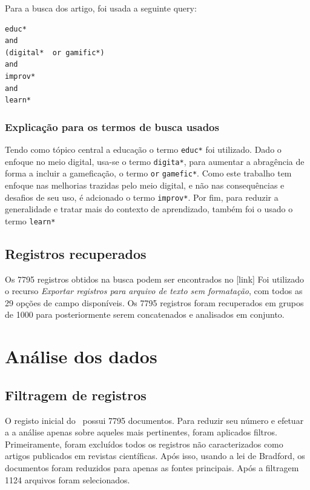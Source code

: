 Para a busca dos artigo, foi usada a seguinte query:
\begin{verbatim}
educ*
and
(digital*  or gamific*)
and
improv*
and
learn*
\end{verbatim}

\subsubsection{Explicação para os termos de busca usados}

Tendo como tópico central a educação o termo \texttt{educ*}  foi utilizado. Dado o enfoque no meio digital, usa-se o termo \texttt{digita*}, para aumentar a abragência de forma a incluir a gameficação, o termo \texttt{or} \texttt{gamefic*}. Como este trabalho tem enfoque nas melhorias trazidas pelo meio digital, e não nas consequências e desafios de seu uso, é adcionado o termo \texttt{improv*}. Por fim, para reduzir a generalidade e tratar mais do contexto de aprendizado, também foi o usado o termo \texttt{learn*}


\subsection{Registros recuperados}

 Os 7795 registros obtidos na busca podem ser encontrados no \href{https://github.com/jhcf/Comput-Experim-20212/blob/main/experiments/MarcusABR/PesquisaBibliometrica/savedrecs.txt}[link]
Foi utilizado o recurso \textit{Exportar registros para arquivo de texto sem formatação}, com todos as 29 opções de campo disponíveis. Os 7795 registros foram recuperados em grupos de 1000 para posteriormente serem concatenados e analisados em conjunto.

\section{Análise dos dados}

\subsection{Filtragem de registros}


O registo inicial do \dataset\ possui 7795 documentos. Para reduzir seu número e efetuar a a análise apenas sobre aqueles mais pertinentes, foram aplicados filtros. Primeiramente, foram excluídos todos os registros não caracterizados como artigos publicados em revistas científicas. Após isso, usando a lei de Bradford, os documentos foram reduzidos para apenas as fontes principais. Após a filtragem 1124 arquivos foram selecionados.

